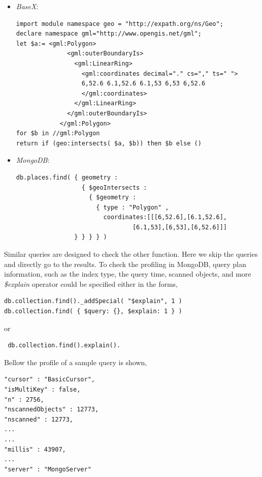 \documentclass[a4paper,12pt]{article}
\begin{document}
\begin{itemize}
\item \textit{BaseX}:
\begin{verbatim}
import module namespace geo = "http://expath.org/ns/Geo";
declare namespace gml="http://www.opengis.net/gml";
let $a:= <gml:Polygon>
              <gml:outerBoundaryIs>
                <gml:LinearRing>
                  <gml:coordinates decimal="." cs="," ts=" ">
                  6,52.6 6.1,52.6 6.1,53 6,53 6,52.6
                  </gml:coordinates>
                </gml:LinearRing>
              </gml:outerBoundaryIs>
            </gml:Polygon>
for $b in //gml:Polygon 
return if (geo:intersects( $a, $b)) then $b else ()
\end{verbatim}
\item \textit{MongoDB}: 
\begin{verbatim}
db.places.find( { geometry :
                  { $geoIntersects :
                    { $geometry :
                      { type : "Polygon" ,
                        coordinates:[[[6,52.6],[6.1,52.6],
                        	    [6.1,53],[6,53],[6,52.6]]]
                } } } } )
\end{verbatim}
\end{itemize}
Similar queries are designed to check the other function. Here we skip the queries and directly go to the results. To check the profiling in MongoDB, query plan information, such as the index type, the query time, scanned objects, and more \textit{\$explain} operator could be specified either in the forms,
\begin{verbatim}
db.collection.find()._addSpecial( "$explain", 1 )
db.collection.find( { $query: {}, $explain: 1 } )
\end{verbatim}
 or 
 \begin{verbatim}
 db.collection.find().explain().
 \end{verbatim}
 
Bellow the profile of a sample query is shown,

\begin{verbatim}
"cursor" : "BasicCursor",
"isMultiKey" : false,
"n" : 2756,
"nscannedObjects" : 12773,
"nscanned" : 12773,
...
...
"millis" : 43907,
...
"server" : "MongoServer"
\end{verbatim}
\end{document}
